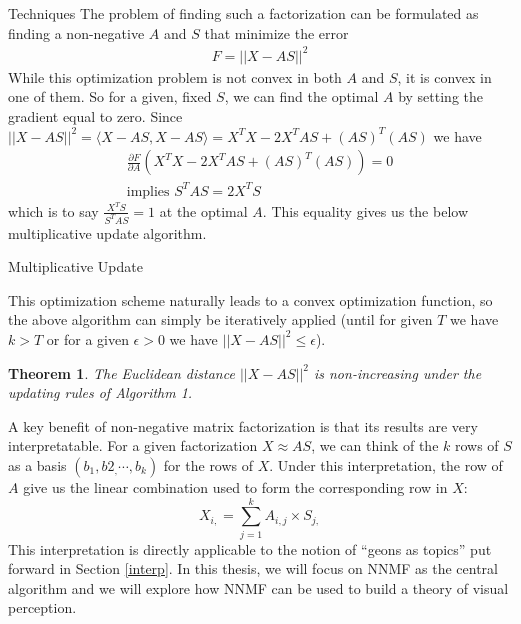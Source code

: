 \documentclass[12pt]{pom_thesis}
\newtheorem{theorem}{Theorem}
\begin{document}
\begin{chapter}{Techniques}
The problem of finding such a factorization can be formulated as finding a non-negative $A$ and $S$ that minimize the error 
\begin{align}F = ||X-AS||^2
\end{align}
While this optimization problem is not convex in both $A$ and $S$, it is convex in one of them. So for a given, fixed $S$, we can find the optimal $A$ by setting the gradient equal to zero. Since $||X-AS||^2 = \langle X-AS, X-AS \rangle= X^TX - 2X^TAS + (AS)^T(AS)$ we have
\begin{align*}
\frac{\partial F }{\partial A} ( X^TX - 2X^TAS + (AS)^T(AS)) = 0\\
\text{implies }S^TAS = 2X^TS
\end{align*}
which is to say $\frac{X^TS}{S^TAS}=1$ at the optimal $A$. This equality gives us the below multiplicative update algorithm. 

\begin{algorithm}[H]
	\caption{Multiplicative Update}
\end{algorithm}

This optimization scheme naturally leads to a convex optimization function, so the above algorithm can simply be iteratively applied (until for given $T$ we have $k>T$ or for a given $\epsilon>0$ we have $||X-AS||^2 \leq \epsilon$).
\begin{theorem}
	The Euclidean distance $||X-AS||^2$ is non-increasing under the updating rules of Algorithm 1.
\end{theorem}

A key benefit of non-negative matrix factorization is that its results are very interpretatable. For a given factorization $X \approx AS$, we can think of the $k$ rows of $S$ as a basis $(b_1,b2_,\cdots,b_k)$ for the rows of $X$. Under this interpretation, the row of $A$ give us the linear combination used to form the corresponding row in $X:$
$$X_{i,} = \sum_{j= 1}^k A_{i,j} \times S_{j,}$$
This interpretation is directly applicable to the notion of ``geons as topics'' put forward in Section \ref{interp}. In this thesis, we will focus on NNMF as the central algorithm and we will explore how NNMF can be used to build a theory of visual perception.

\end{chapter}
\end{document}
